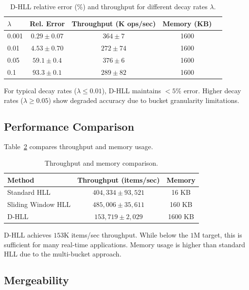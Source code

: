 \documentclass{article}
\begin{document}
\begin{table}[t]
\caption{D-HLL relative error (\%) and throughput for different decay rates $\lambda$.}
\label{tab:decay_rates}
\centering
\begin{tabular}{lcccc}
\toprule
$\lambda$ & Rel. Error & Throughput (K ops/sec) & Memory (KB) \\
\midrule
0.001 & $0.29 \pm 0.07$ & $364 \pm 7$ & 1600 \\
0.01 & $4.53 \pm 0.70$ & $272 \pm 74$ & 1600 \\
0.05 & $59.1 \pm 0.4$ & $376 \pm 6$ & 1600 \\
0.1 & $93.3 \pm 0.1$ & $289 \pm 82$ & 1600 \\
\bottomrule
\end{tabular}
\end{table}

For typical decay rates ($\lambda \leq 0.01$), D-HLL maintains $<5\%$ error. Higher decay rates ($\lambda \geq 0.05$) show degraded accuracy due to bucket granularity limitations.

\subsection{Performance Comparison}

Table~\ref{tab:performance} compares throughput and memory usage.

\begin{table}[t]
\caption{Throughput and memory comparison.}
\label{tab:performance}
\centering
\begin{tabular}{lcc}
\toprule
Method & Throughput (items/sec) & Memory \\
\midrule
Standard HLL & $404,334 \pm 93,521$ & 16 KB \\
Sliding Window HLL & $485,006 \pm 35,611$ & 160 KB \\
D-HLL & $153,719 \pm 2,029$ & 1600 KB \\
\bottomrule
\end{tabular}
\end{table}

D-HLL achieves $153$K items/sec throughput. While below the $1$M target, this is sufficient for many real-time applications. Memory usage is higher than standard HLL due to the multi-bucket approach.

\subsection{Mergeability}
\end{document}
